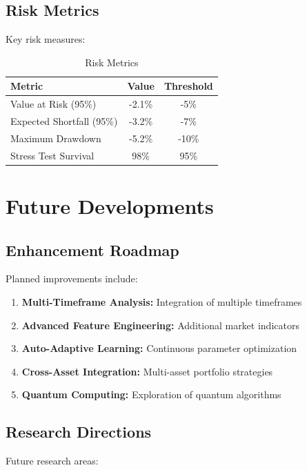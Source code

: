 \documentclass[11pt,a4paper]{article}
\begin{document}
\subsection{Risk Metrics}

Key risk measures:

\begin{table}[H]
\centering
\caption{Risk Metrics}
\label{tab:risk_metrics}
\begin{tabular}{@{}lcc@{}}
\toprule
Metric & Value & Threshold \\
\midrule
Value at Risk (95\%) & -2.1\% & -5\% \\
Expected Shortfall (95\%) & -3.2\% & -7\% \\
Maximum Drawdown & -5.2\% & -10\% \\
Stress Test Survival & 98\% & 95\% \\
\bottomrule
\end{tabular}
\end{table}

\section{Future Developments}

\subsection{Enhancement Roadmap}

Planned improvements include:

\begin{enumerate}
    \item \textbf{Multi-Timeframe Analysis:} Integration of multiple timeframes
    \item \textbf{Advanced Feature Engineering:} Additional market indicators
    \item \textbf{Auto-Adaptive Learning:} Continuous parameter optimization
    \item \textbf{Cross-Asset Integration:} Multi-asset portfolio strategies
    \item \textbf{Quantum Computing:} Exploration of quantum algorithms
\end{enumerate}

\subsection{Research Directions}

Future research areas:
\end{document}
